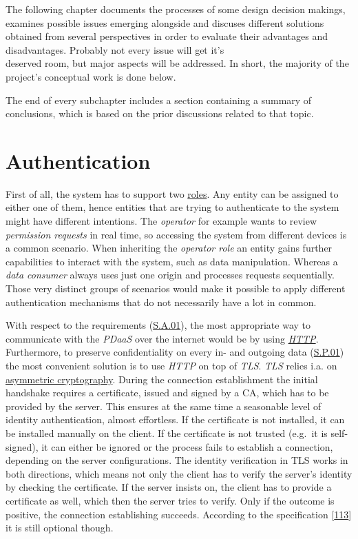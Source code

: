 \documentclass[12pt,english,a4paper,titlepage,cleardoublepage=empty,dottedtoc]{report}
\begin{document}
The following chapter documents the processes of some design decision
makings, examines possible issues emerging alongside and discuses
different solutions obtained from several perspectives in order to
evaluate their advantages and disadvantages. Probably not every issue
will get it's\\
deserved room, but major aspects will be addressed. In short, the
majority of the project's conceptual work is done below.

The end of every subchapter includes a section containing a summary of
conclusions, which is based on the prior discussions related to that
topic.

\hypertarget{authentication}{\section{Authentication}\label{authentication}}

First of all, the system has to support two
\protect\hyperlink{sa03}{roles}. Any entity can be assigned to either
one of them, hence entities that are trying to authenticate to the
system might have different intentions. The \emph{operator} for example
wants to review \emph{permission requests} in real time, so accessing
the system from different devices is a common scenario. When inheriting
the \emph{operator role} an entity gains further capabilities to
interact with the system, such as data manipulation. Whereas a
\emph{data consumer} always uses just one origin and processes requests
sequentially. Those very distinct groups of scenarios would make it
possible to apply different authentication mechanisms that do not
necessarily have a lot in common.

With respect to the requirements (\protect\hyperlink{sa01}{S.A.01}), the
most appropriate way to communicate with the \emph{PDaaS} over the
internet would be by using \emph{\protect\hyperlink{link_http}{HTTP}}.
Furthermore, to preserve confidentiality on every in- and outgoing data
(\protect\hyperlink{sp01}{S.P.01}) the most convenient solution is to
use \emph{HTTP} on top of \emph{TLS}. \emph{TLS} relies i.a. on
\protect\hyperlink{link_asym-crypto}{asymmetric cryptography}. During
the connection establishment the initial handshake requires a
certificate, issued and signed by a CA, which has to be provided by the
server. This ensures at the same time a seasonable level of identity
authentication, almost effortless. If the certificate is not installed,
it can be installed manually on the client. If the certificate is not
trusted (e.g.~it is self-signed), it can either be ignored or the
process fails to establish a connection, depending on the server
configurations. The identity verification in TLS works in both
directions, which means not only the client has to verify the server's
identity by checking the certificate. If the server insists on, the
client has to provide a certificate as well, which then the server tries
to verify. Only if the outcome is positive, the connection establishing
succeeds. According to the specification
{[}\protect\hyperlink{ref-web_spec_tls-12_client-auth}{113}{]} it is
still optional though.
\end{document}
